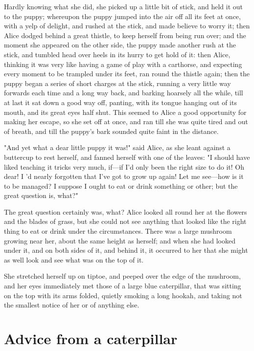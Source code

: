 Hardly knowing what she did, she picked up a little bit of stick, and held it out to the puppy; whereupon the puppy jumped into the air off all its feet at once, with a yelp of ​delight, and rushed at the stick, and made believe to worry it; then Alice dodged behind a great thistle, to keep herself from being run over; and the moment she appeared on the other side, the puppy made another rush at the stick, and tumbled head over heels in its hurry to get hold of it: then Alice, thinking it was very like having a game of play with a carthorse, and expecting every moment to be trampled under its feet, ran round the thistle again; then the puppy began a series of short charges at the stick, running a very little way forwards each time and a long way back, and barking hoarsely all the while, till at last it sat down a good way off, panting, with its tongue hanging out of its mouth, and its great eyes half shut.
This seemed to Alice a good opportunity for making her escape, so she set off at once, and ran till she was quite tired and out of breath, and till the puppy's bark sounded quite faint in the distance.

​"And yet what a dear little puppy it was!" said Alice, as she leant against a buttercup to rest herself, and fanned herself with one of the leaves: "I should have liked teaching it tricks very much, if—if I'd only been the right size to do it! Oh dear! I 'd nearly forgotten that I've got to grow up again! Let me see—how is it to be managed? I suppose I ought to eat or drink something or other; but the great question is, what?"

The great question certainly was, what? Alice looked all round her at the flowers and the blades of grass, but she could not see anything that looked like the right thing to eat or drink under the circumstances. There was a large mushroom growing near her, about the same height as herself; and when she had looked under it, and on both sides of it, and behind it, it occurred to her that she might as well look and see what was on the top of it.

She stretched herself up on tiptoe, and peeped over the edge of the mushroom, and her ​eyes immediately met those of a large blue caterpillar, that was sitting on the top with its arms folded, quietly smoking a long hookah, and taking not the smallest notice of her or of anything else.

\quebra\chapter*{Advice from a caterpillar}

